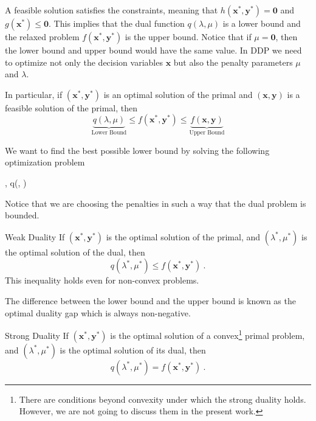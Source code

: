 A feasible solution satisfies the constraints, meaning that $h(\mathbf{x}^{*}, \mathbf{y}^{*})=\mathbf{0}$ and $g(\mathbf{x}^{*}) \leq \mathbf{0}$. This implies that the dual function $q(\lambda,\mu)$ is a lower bound and the relaxed problem $f(\mathbf{x}^{*}, \mathbf{y}^{*})$ is the upper bound. Notice that if $\mu = \mathbf{0}$, then the lower bound and upper bound would have the same value. In DDP we need to optimize not only the decision variables $\mathbf{x}$ but also the penalty parameters $\mu$ and $\lambda$.
\begin{corollary}{}{}
  In particular, if $(\mathbf{x}^{*}, \mathbf{y}^{*})$ is an optimal solution of the primal and $(\mathbf{x}, \mathbf{y})$ is a feasible solution of the primal, then
  \begin{equation}
      \underbrace{q({\lambda,\mu})}_{\textrm{Lower Bound}} \leq f(\mathbf{x}^{*}, \mathbf{y}^{*}) \leq \underbrace{f(\mathbf{x}, \mathbf{y})}_{\textrm{Upper Bound}}
  \end{equation}
\end{corollary}
We want to find the best possible lower bound by solving the following optimization problem
\begin{maxi!}[2]
	{\lambda, \mu}{q(\lambda, \mu)}{\label{eq: Abstract_Dual}}{}{}
\end{maxi!}
Notice that we are choosing the penalties in such a way that the dual problem is bounded.
\begin{theorem}{Weak Duality}{}
If $(\mathbf{x}^{*}, \mathbf{y}^{*})$ is the optimal solution of the primal, and $(\lambda^{*}, \mu^{*})$ is the optimal solution of the dual, then
\begin{equation}
    q(\lambda^{*}, \mu^{*}) \leq f(\mathbf{x}^{*}, \mathbf{y}^{*})\ .
\end{equation}
This inequality holds even for non-convex problems.
\end{theorem}
The difference between the lower bound and the upper bound is known as the optimal duality gap which is always non-negative.
\begin{theorem}{Strong Duality}{}
If $(\mathbf{x}^{*}, \mathbf{y}^{*})$ is the optimal solution of a convex\footnote{There are conditions beyond convexity under which the strong duality holds. However, we are not going to discuss them in the present work.} primal problem, and $(\lambda^{*}, \mu^{*})$ is the optimal solution of its dual, then
\begin{equation}
    q(\lambda^{*}, \mu^{*}) = f(\mathbf{x}^{*}, \mathbf{y}^{*})\ .
\end{equation}
\end{theorem}
